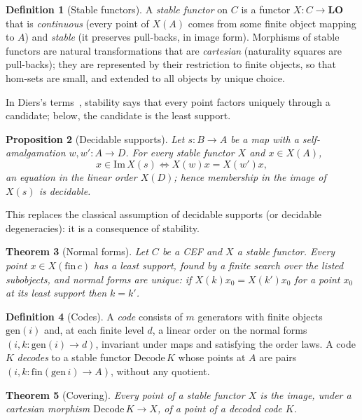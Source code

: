 \documentclass[11pt]{article}
\newtheorem{theorem}{Theorem}[section]
\newtheorem{proposition}[theorem]{Proposition}
\theoremstyle{definition}
\newtheorem{definition}[theorem]{Definition}
\theoremstyle{remark}
\newcommand{\LO}{\mathbf{LO}}
\begin{document}
\begin{definition}[Stable functors]
A \emph{stable functor} on $C$ is a functor $X:C\to\LO$ that is
\emph{continuous} (every point of $X(A)$ comes from some finite object
mapping to $A$) and \emph{stable} (it preserves pull-backs, in image
form). Morphisms of stable functors are natural transformations that are
\emph{cartesian} (naturality squares are pull-backs); they are represented
by their restriction to finite objects, so that hom-sets are small, and
extended to all objects by unique choice.
\end{definition}

In Diers's terms~\cite{Osm1}, stability says that every point factors
uniquely through a candidate; below, the candidate is the least support.

\begin{proposition}[Decidable supports]
Let $s:B\to A$ be a map with a self-amalgamation $w,w':A\to D$. For every
stable functor $X$ and $x\in X(A)$,
\[ x\in \mathrm{Im}\,X(s)\iff X(w)x=X(w')x ,\]
an equation in the linear order $X(D)$; hence membership in the image of
$X(s)$ is decidable.
\end{proposition}

This replaces the classical assumption of decidable supports (or decidable
degeneracies): it is a consequence of stability.

\begin{theorem}[Normal forms]
Let $C$ be a CEF and $X$ a stable functor. Every point $x\in X(\mathrm{fin}\,c)$
has a least support, found by a finite search over the listed subobjects,
and normal forms are unique: if $X(k)x_0=X(k')x_0$ for a point $x_0$ at its
least support then $k=k'$.
\end{theorem}

\begin{definition}[Codes]
A \emph{code} consists of $m$ generators with finite objects
$\mathrm{gen}(i)$ and, at each finite level $d$, a linear order on the
normal forms $(i,k:\mathrm{gen}(i)\to d)$, invariant under maps and
satisfying the order laws. A code $K$ \emph{decodes} to a stable functor
$\mathrm{Decode}\,K$ whose points at $A$ are pairs
$(i,k:\mathrm{fin}(\mathrm{gen}\,i)\to A)$, without any quotient.
\end{definition}

\begin{theorem}[Covering]
Every point of a stable functor $X$ is the image, under a cartesian
morphism $\mathrm{Decode}\,K\to X$, of a point of a decoded code $K$.
\end{theorem}
\end{document}
